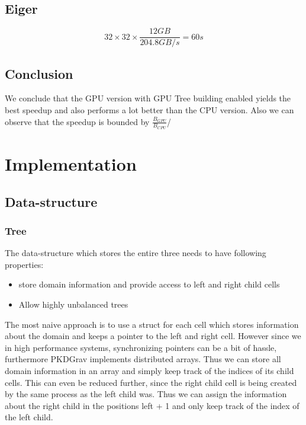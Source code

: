 \documentclass[]{article}
\begin{document}
\vspace{5mm}


\subsection{Eiger}

\begin{center}
	\begin{equation}
		32 \times 32 \times \frac{ 12 GB }{204.8 GB/s} = 60s
	\end{equation}
\end{center}

\subsection{Conclusion}

We conclude that the GPU version with GPU Tree building enabled yields the best speedup and also performs a lot better than the CPU version. Also we can observe that the speedup is bounded by $\frac{B_{GPU}}{B_{CPU}}$/ 

\section{Implementation}

\subsection{Data-structure}

\subsubsection{Tree}

The data-structure which stores the entire three needs to have following properties:

\begin{itemize}
	\item store domain information and provide access to left and right child cells
	\item Allow highly unbalanced trees
\end{itemize}

The most naive approach is to use a struct for each cell which stores information about the domain and keeps a pointer to the left and right cell. However since we in high performance systems, synchronizing pointers can be a bit of hassle, furthermore PKDGrav implements distributed arrays. Thus we can store all domain information in an array and simply keep track of the indices of its child cells. This can even be reduced further, since the right child cell is being created by the same process as the left child was. Thus we can assign the information about the right child in the positions left + 1 and only keep track of the index of the left child.
\end{document}
